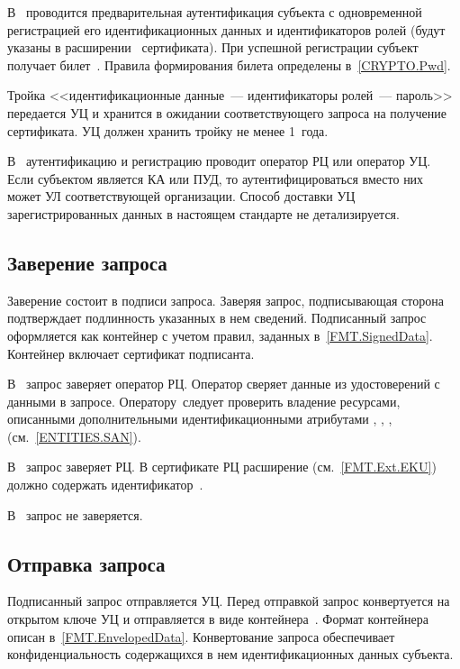В~ проводится предварительная аутентификация субъекта с
одновременной регистрацией его идентификационных данных и идентификаторов ролей
(будут указаны в расширении~ сертификата). При
успешной регистрации субъект получает билет~. 
%
Правила формирования билета определены в~\ref{CRYPTO.Pwd}.

Тройка <<идентификационные данные~--- идентификаторы ролей~--- пароль>> 
передается УЦ и хранится в ожидании соответствующего запроса на получение 
сертификата. УЦ должен хранить тройку не менее 1~года.

В~ аутентификацию и регистрацию проводит оператор РЦ или оператор
УЦ. Если субъектом является КА или ПУД, то аутентифицироваться вместо них может
УЛ соответствующей организации.
%
Способ доставки УЦ зарегистрированных данных в настоящем стандарте не
детализируется.

\subsection{Заверение запроса}\label{PROCESSES.Enroll.Signed}

Заверение состоит в подписи запроса. Заверяя запрос, подписывающая сторона
подтверждает подлинность указанных в нем сведений. Подписанный запрос
оформляется как контейнер  с учетом правил, заданных
в~\ref{FMT.SignedData}. Контейнер включает сертификат подписанта.

В~ запрос заверяет оператор РЦ. Оператор сверяет данные из
удостоверений с данными в запросе.
%
Оператору~следует проверить владение ресурсами, описанными дополнительными
идентификационными атрибутами , , , 
(см.~\ref{ENTITIES.SAN}).

В~ запрос заверяет РЦ. В сертификате РЦ расширение
  (см.~\ref{FMT.Ext.EKU}) должно содержать
идентификатор~.

В~ запрос не заверяется.

\subsection{Отправка запроса}\label{PROCESSES.Enroll.Enveloped}

Подписанный запрос отправляется УЦ. Перед отправкой запрос конвертуется на
открытом ключе УЦ и отправляется в виде контейнера~. Формат
контейнера описан в~\ref{FMT.EnvelopedData}. Конвертование запроса обеспечивает
конфиденциальность содержащихся в нем идентификационных данных субъекта.

